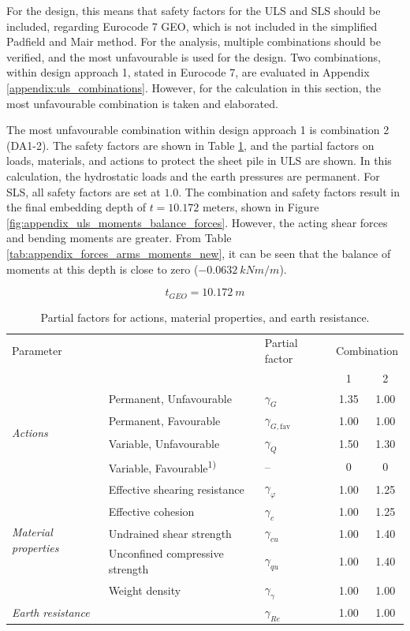 For the design, this means that safety factors for the ULS and SLS should be included, regarding Eurocode 7 GEO, which is not included in the simplified Padfield and Mair method. For the analysis, multiple combinations should be verified, and the most unfavourable is used for the design. Two combinations, within design approach 1, stated in Eurocode 7, are evaluated in Appendix \ref{appendix:uls_combinations}. However, for the calculation in this section, the most unfavourable combination is taken and elaborated.

The most unfavourable combination within design approach 1 is combination 2 (DA1-2). The safety factors are shown in Table \ref{tab:partial_factors}, and the partial factors on loads, materials, and actions to protect the sheet pile in ULS are shown. In this calculation, the hydrostatic loads and the earth pressures are permanent. For SLS, all safety factors are set at $1.0$. The combination and safety factors result in the final embedding depth of $t = 10.172$ meters,  shown in Figure \ref{fig:appendix_uls_moments_balance_forces}. However, the acting shear forces and bending moments are greater. From Table \ref{tab:appendix_forces_arms_moments_new}, it can be seen that the balance of moments at this depth is close to zero ($-0.0632 \ kNm/m$).

\begin{equation}
    t_{GEO} = 10.172 \ m
\end{equation}

\begin{table}[H]
\centering
\small
\setlength{\tabcolsep}{8pt}
\renewcommand{\arraystretch}{1.2}
\begin{tabular}{@{}l l l c c@{}}
\toprule
\multicolumn{1}{l}{Parameter} & 
\multicolumn{1}{l}{ } & 
\multicolumn{1}{l}{Partial factor} & 
\multicolumn{2}{c}{Combination}\\
\cmidrule(lr){4-5}
 & & & 1 & 2 \\
\midrule
\multirow{4}{*}{\textit{Actions}} 
 & Permanent, Unfavourable & $\gamma_G$ & 1.35 & 1.00 \\
 & Permanent, Favourable   & $\gamma_{G,\mathrm{fav}}$ & 1.00 & 1.00 \\
 & Variable, Unfavourable  & $\gamma_Q$ & 1.50 & 1.30 \\
 & Variable, Favourable\textsuperscript{1)} & -- & 0 & 0 \\
\midrule
\multirow{5}{*}{\textit{Material properties}} 
 & Effective shearing resistance & $\gamma_\varphi$ & 1.00 & 1.25 \\
 & Effective cohesion & $\gamma_c$ & 1.00 & 1.25 \\
 & Undrained shear strength & $\gamma_{cu}$ & 1.00 & 1.40 \\
 & Unconfined compressive strength & $\gamma_{qu}$ & 1.00 & 1.40 \\
 & Weight density & $\gamma_\gamma$ & 1.00 & 1.00 \\
\midrule
\textit{Earth resistance} & & $\gamma_{Re}$ & 1.00 & 1.00 \\
\bottomrule
\end{tabular}
\caption{Partial factors for actions, material properties, and earth resistance.}
\label{tab:partial_factors}
\end{table}

